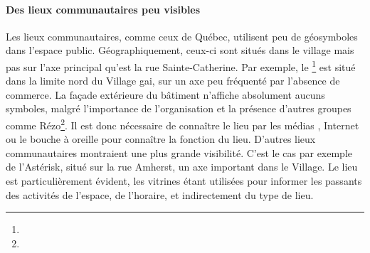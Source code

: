 \paragraph{Des lieux communautaires peu visibles}
Les lieux communautaires, comme ceux de Québec, utilisent peu de géosymboles dans l'espace public.
Géographiquement, ceux-ci sont situés dans le village mais pas sur l'axe principal qu'est la rue Sainte-Catherine.
Par exemple, le \ccglm{}\footnote{} est situé dans la limite nord du Village gai, sur un axe peu fréquenté par l'absence de commerce.
La façade extérieure du bâtiment n'affiche absolument aucuns symboles, malgré l'importance de l'organisation et la présence d'autres groupes \lgbt{} comme Rézo\footnote{}.
Il est donc nécessaire de connaître le lieu par les médias \lgbt{}, Internet ou le bouche à oreille pour connaître la fonction du lieu.
D'autres lieux communautaires montraient une plus grande visibilité.
C'est le cas par exemple de l'Astérisk, situé sur la rue Amherst, un axe important dans le Village.
Le lieu est particulièrement évident, les vitrines étant utilisées pour informer les passants des activités de l'espace, de l'horaire, et indirectement du type de lieu.

